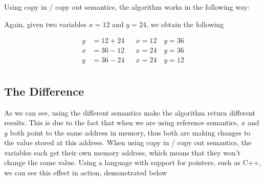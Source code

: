 \documentclass{article}
\begin{document}
    Using copy in / copy out semantics, the algorithm works in the following way:
    \medskip

    Again, given two variables \( x = 12 \) and \( y = 24 \), we obtain the following

    \begin{align*}
        y &= 12 + 24 && x = 12 \quad y = 36 \\
        x &= 36 - 12 && x = 24 \quad y = 36 \\
        y &= 36 - 24 && x = 24 \quad y = 12\\
    \end{align*}

    \subsection{The Difference}

    As we can see, using the different semantics make the algorithm return different results. This is due to the fact that when we are using reference semantics, \( x \) and \( y \) both point to the same address in memory, thus both are making changes to the value stored at this address. When using copy in / copy out semantics, the variables each get their own memory address, which means that they won't change the same value. Using a language with support for pointers, such as C++, we can see this effect in action, demonstrated below
\end{document}
